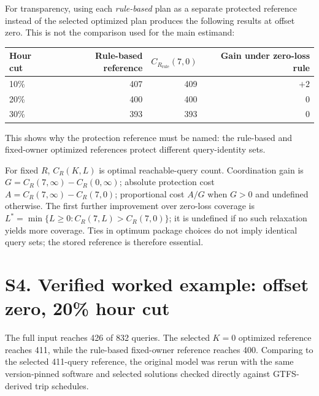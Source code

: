 \documentclass[10pt]{article}
\begin{document}
For transparency, using each \emph{rule-based} plan as a separate protected reference instead of the selected optimized plan produces the following results at offset zero. This is not the comparison used for the main estimand:
\begin{center}\small
\begin{tabular}{@{}lrrr@{}}\toprule
Hour cut & Rule-based reference & $C_{R_\mathrm{rule}}(7,0)$ & Gain under zero-loss rule \\\midrule
10\% & 407 & 409 & $+2$ \\
20\% & 400 & 400 & $0$ \\
30\% & 393 & 393 & $0$ \\\bottomrule
\end{tabular}
\end{center}
This shows why the protection reference must be named: the rule-based and fixed-owner optimized references protect different query-identity sets.

For fixed $R$, $C_R(K,L)$ is optimal reachable-query count. Coordination gain is $G=C_R(7,\infty)-C_R(0,\infty)$; absolute protection cost $A=C_R(7,\infty)-C_R(7,0)$; proportional cost $A/G$ when $G>0$ and undefined otherwise. The first further improvement over zero-loss coverage is $L^*=\min\{L\ge0:C_R(7,L)>C_R(7,0)\}$; it is undefined if no such relaxation yields more coverage. Ties in optimum package choices do not imply identical query sets; the stored reference is therefore essential.

\section*{S4. Verified worked example: offset zero, 20\% hour cut}
The full input reaches 426 of 832 queries. The selected $K=0$ optimized reference reaches 411, while the rule-based fixed-owner reference reaches 400. Comparing to the selected 411-query reference, the original model was rerun with the same version-pinned software and selected solutions checked directly against GTFS-derived trip schedules.
\end{document}
